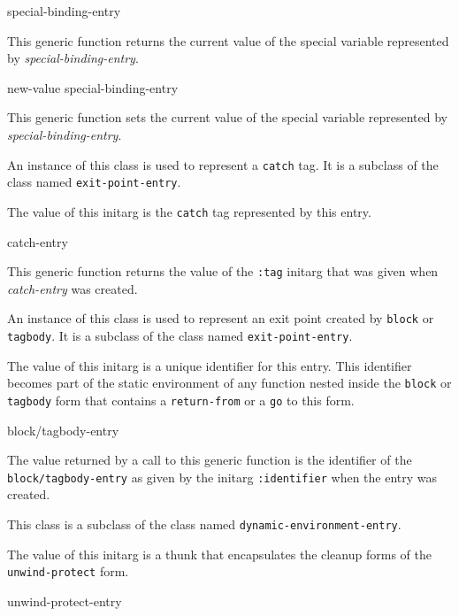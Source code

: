  {special-binding-entry}

This generic function returns the current value of the special
variable represented by \textit{special-binding-entry}.

 {new-value special-binding-entry}

This generic function sets the current value of the special
variable represented by \textit{special-binding-entry}.


An instance of this class is used to represent a \texttt{catch} tag.
It is a subclass of the class named \texttt{exit-point-entry}.


The value of this initarg is the \texttt{catch} tag represented by
this entry.

 {catch-entry}

This generic function returns the value of the \texttt{:tag} initarg
that was given when \textit{catch-entry} was created.


An instance of this class is used to represent an exit point created
by \texttt{block} or \texttt{tagbody}.  It is a subclass of the class
named \texttt{exit-point-entry}.


The value of this initarg is a unique identifier for this entry.  This
identifier becomes part of the static environment of any function
nested inside the \texttt{block} or \texttt{tagbody} form that
contains a \texttt{return-from} or a \texttt{go} to this form.

 {block/tagbody-entry}

The value returned by a call to this generic function is the
identifier of the \texttt{block/tagbody-entry} as given by the initarg
\texttt{:identifier} when the entry was created.


This class is a subclass of the class named
\texttt{dynamic-environment-entry}.


The value of this initarg is a thunk that encapsulates the cleanup
forms of the \texttt{unwind-protect} form.

 {unwind-protect-entry}

